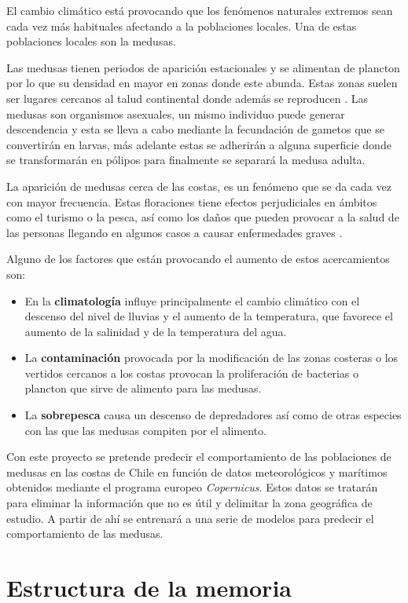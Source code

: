 
\begin{comment}
Descripción del contenido del trabajo y del estrucutra de la memoria y del resto de materiales entregados.
\end{comment}

El cambio climático está provocando que los fenómenos naturales extremos sean cada vez más habituales afectando a la poblaciones locales. Una de estas poblaciones locales son la medusas.

Las medusas tienen periodos de aparición estacionales y se alimentan de plancton por lo que su densidad en mayor en zonas donde este abunda. Estas zonas suelen ser lugares cercanos al talud continental donde además se reproducen \cite{noauthor_proliferaciones_nodate}. Las medusas son organismos asexuales, un mismo individuo puede generar descendencia y esta se lleva a cabo mediante la fecundación de gametos que se convertirán en larvas, más adelante estas se adherirán a alguna superficie donde se transformarán en pólipos para finalmente se separará la medusa adulta.\cite{noauthor_reproduccion_2016}

La aparición de medusas cerca de las costas, es un fenómeno que se da cada vez con mayor frecuencia. Estas floraciones tiene efectos perjudiciales en ámbitos como el turismo o la pesca, así como los daños que pueden provocar a la salud de las personas llegando en algunos casos a causar enfermedades graves \cite{art:picaduras_1,art:picaduras_2}. 

Alguno de los factores que están provocando el aumento de estos acercamientos son\cite{noauthor_proliferaciones_nodate,art:ArticuloCanepa_1}:
\begin{itemize}
	\item En la \textbf{climatología} influye principalmente el cambio climático con el descenso del nivel de lluvias y el aumento de la temperatura, que favorece el aumento de la salinidad y de la temperatura del agua. 
	\item La \textbf{contaminación} provocada por la modificación de las zonas costeras o los vertidos cercanos a los costas provocan la proliferación de bacterias o plancton que sirve de alimento para las medusas.
	\item La \textbf{sobrepesca} causa un descenso de depredadores así como de otras especies con las que las medusas compiten por el alimento.
\end{itemize}

Con este proyecto se pretende predecir el comportamiento de las poblaciones de medusas en las costas de Chile en función de datos meteorológicos y marítimos obtenidos mediante el programa europeo \emph{Copernicus}. Estos datos se tratarán para eliminar la información que no es útil y delimitar la zona geográfica de estudio. A partir de ahí se entrenará a una serie de modelos para predecir el comportamiento de las medusas.

\section{Estructura de la memoria}